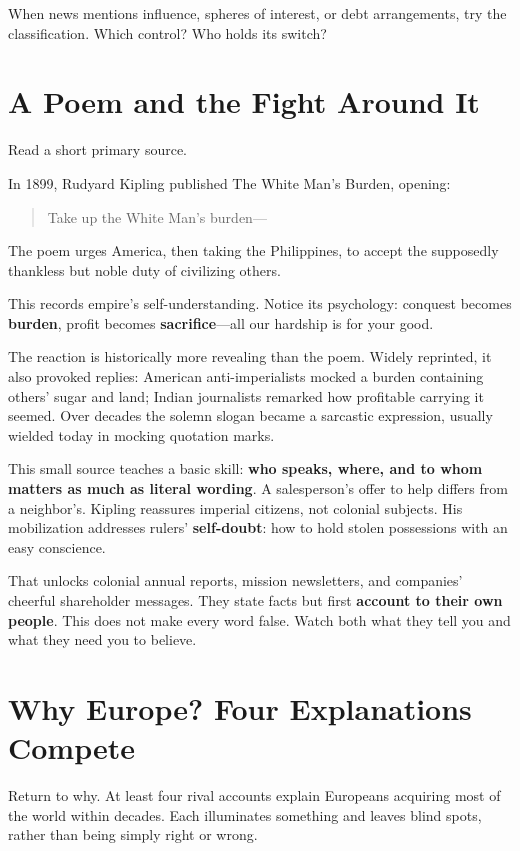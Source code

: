 When news mentions influence, spheres of interest, or debt arrangements, try the classification. Which control? Who holds its switch?

\section{A Poem and the Fight Around It}
Read a short primary source.

In 1899, Rudyard Kipling published The White Man's Burden, opening:

\begin{quote}
Take up the White Man's burden—
\end{quote}
The poem urges America, then taking the Philippines, to accept the supposedly thankless but noble duty of civilizing others.

This records empire's self-understanding. Notice its psychology: conquest becomes \textbf{burden}, profit becomes \textbf{sacrifice}---all our hardship is for your good.

The reaction is historically more revealing than the poem. Widely reprinted, it also provoked replies: American anti-imperialists mocked a burden containing others' sugar and land; Indian journalists remarked how profitable carrying it seemed. Over decades the solemn slogan became a sarcastic expression, usually wielded today in mocking quotation marks.

This small source teaches a basic skill: \textbf{who speaks, where, and to whom matters as much as literal wording}. A salesperson's offer to help differs from a neighbor's. Kipling reassures imperial citizens, not colonial subjects. His mobilization addresses rulers' \textbf{self-doubt}: how to hold stolen possessions with an easy conscience.

That unlocks colonial annual reports, mission newsletters, and companies' cheerful shareholder messages. They state facts but first \textbf{account to their own people}. This does not make every word false. Watch both what they tell you and what they need you to believe.

\section{Why Europe? Four Explanations Compete}
Return to why. At least four rival accounts explain Europeans acquiring most of the world within decades. Each illuminates something and leaves blind spots, rather than being simply right or wrong.


